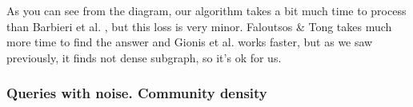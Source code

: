   \begin{center}
  \end{center}

As you can see from the diagram, our algorithm takes a bit much time to process than Barbieri et al. \cite{Barbieri15}, but this loss is very minor. Faloutsos \& Tong \cite{Faloutsos06} takes much more time to find the answer and Gionis et al. \cite{Gionis15} works faster, but as we saw previously, it finds not dense subgraph, so it's ok for us.

\subsubsection{Queries with noise. Community density}

  \begin{center}
  \end{center}


